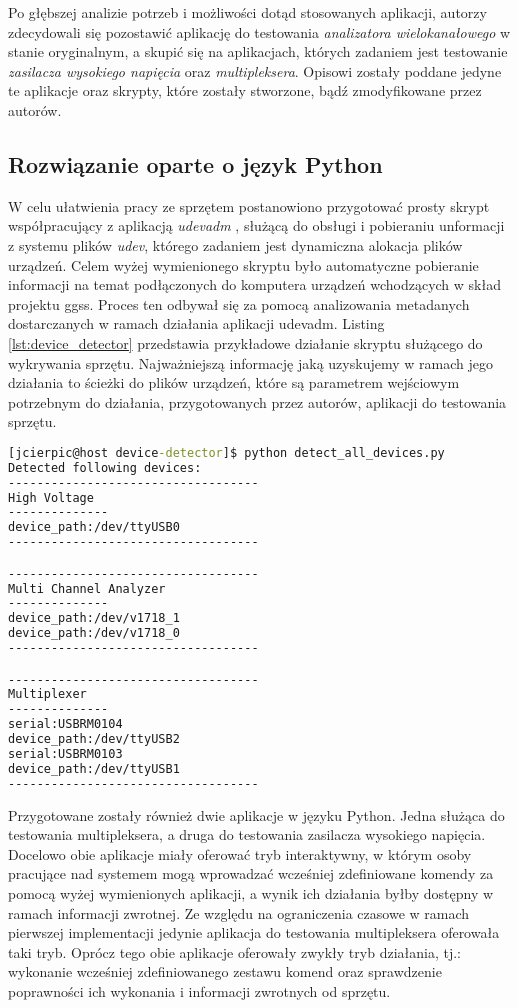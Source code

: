 Po głębszej analizie potrzeb i możliwości dotąd stosowanych aplikacji, autorzy zdecydowali się pozostawić aplikację do testowania \emph{analizatora wielokanałowego} w stanie oryginalnym, a skupić się na aplikacjach, których zadaniem jest testowanie \emph{zasilacza wysokiego napięcia} oraz \emph{multipleksera}. Opisowi zostały poddane jedyne te aplikacje oraz skrypty, które zostały stworzone, bądź zmodyfikowane przez autorów.

\subsection{Rozwiązanie oparte o język Python}

W celu ułatwienia pracy ze sprzętem postanowiono przygotować prosty skrypt współpracujący z aplikacją \emph{udevadm} \cite{udevadm}, służącą do obsługi i pobieraniu unformacji z systemu plików \emph{udev}, którego zadaniem jest dynamiczna alokacja plików urządzeń. Celem wyżej wymienionego skryptu było automatyczne pobieranie informacji na temat podłączonych do komputera urządzeń wchodzących w skład projektu ggss. Proces ten odbywał się za pomocą analizowania metadanych dostarczanych w ramach działania aplikacji udevadm. Listing \ref{lst:device_detector} przedstawia przykładowe działanie skryptu służącego do wykrywania sprzętu. Najważniejszą informację jaką uzyskujemy w ramach jego działania to ścieżki do plików urządzeń, które są parametrem wejściowym potrzebnym do działania, przygotowanych przez autorów, aplikacji do testowania sprzętu.

\begin{lstlisting}[language=cmd,caption={Przykład działania skryptu do automatycznego wykrywania podłączonych urządzeń},label={lst:device_detector},frame=single]
[jcierpic@host device-detector]$ python detect_all_devices.py
Detected following devices:
-----------------------------------
High Voltage
--------------
device_path:/dev/ttyUSB0
-----------------------------------

-----------------------------------
Multi Channel Analyzer
--------------
device_path:/dev/v1718_1
device_path:/dev/v1718_0
-----------------------------------

-----------------------------------
Multiplexer
--------------
serial:USBRM0104
device_path:/dev/ttyUSB2
serial:USBRM0103
device_path:/dev/ttyUSB1
-----------------------------------
\end{lstlisting}

Przygotowane zostały również dwie aplikacje w języku Python. Jedna służąca do testowania multipleksera, a druga do testowania zasilacza wysokiego napięcia. Docelowo obie aplikacje miały oferować tryb interaktywny, w którym osoby pracujące nad systemem mogą wprowadzać wcześniej zdefiniowane komendy za pomocą wyżej wymienionych aplikacji, a wynik ich działania byłby dostępny w ramach informacji zwrotnej. Ze względu na ograniczenia czasowe w ramach pierwszej implementacji jedynie aplikacja do testowania multipleksera oferowała taki tryb. Oprócz tego obie aplikacje oferowały zwykły tryb działania, tj.: wykonanie wcześniej zdefiniowanego zestawu komend oraz sprawdzenie poprawności ich wykonania i informacji zwrotnych od sprzętu.

